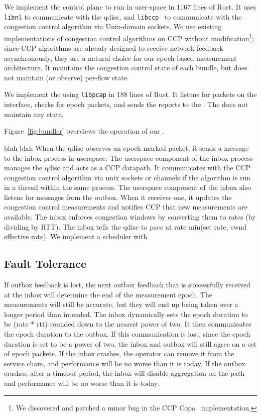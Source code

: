 We implement the \inbox control plane to run in user-space in $1167$ lines of Rust. 
It uses \texttt{libnl} to communicate with the qdisc, and \texttt{libccp}~\cite{ccp} to communicate with the congestion control algorithm via Unix-domain sockets.
We use existing implementations of congestion control algorithms on CCP without modification\footnote{We discovered and patched a minor bug in the CCP Copa~\cite{copa} implementation.}; since CCP algorithms are already designed to receive network feedback asynchronously, they are a natural choice for our epoch-based measurement architecture.
It maintains the congestion control state of each bundle, but does not maintain (or observe) per-flow state.

We implement the \outbox using \texttt{libpcap} in $188$ lines of Rust. It listens for packets on the interface, checks for epoch packets, and sends the reports to the \inbox. 
The \outbox does not maintain any state.

Figure~\ref{fig:bundler} overviews the operation of our \name.

\begin{outline}
\1 blah
    \2 blah
        \3 When the qdisc observes an epoch-marked packet, it sends a message to the inbox process in userspace.
        \3 The userspace component of the inbox process manages the qdisc and acts as a CCP datapath. It communicates with the CCP congestion control algorithm via unix sockets or channels if the algorithm is run in a thread within the same process.
        \3 The userspace component of the inbox also listens for messages from the outbox. When it receives one, it updates the congestion control measurements and notifies CCP that new measurements are available.
        \3 The inbox enforces congestion windows by converting them to rates (by dividing by RTT). The inbox tells the qdisc to pace at rate min(set rate, cwnd effective rate).
    \2 We implement a scheduler with 
\end{outline}

\subsection{Fault Tolerance}\label{s:impl:ft}
\begin{outline}
\1 If outbox feedback is lost, the next outbox feedback that is successfully received at the inbox will determine the end of the measurement epoch.
    \2 The measurements will still be accurate, but they will end up being taken over a longer period than intended.
\1 The inbox dynamically sets the epoch duration to be (rate * rtt) rounded down to the nearest power of two. It then communicates the epoch duration to the outbox.
    \2 If this communication is lost, since the epoch duration is set to be a power of two, the inbox and outbox will still agree on a set of epoch packets.
\1 If the inbox crashes, the operator can remove it from the service chain, and performance will be no worse than it is today.
\1 If the outbox crashes, after a timeout period, the inbox will disable aggregation on the path and performance will be no worse than it is today.
\end{outline}

